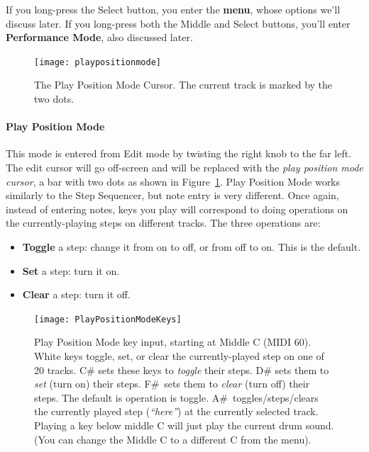 \documentclass{article}
\begin{document}
If you long-press the Select button, you enter the {\bf menu}, whose options we'll discuss later.    If you long-press both the Middle and Select buttons, you'll enter {\bf Performance Mode}, also discussed later.

\begin{figure}
\vspace{-1em}
\hspace{\fill}\texttt{[image: playpositionmode]}\hspace{\fill}
\caption{\small The Play Position Mode Cursor.  The current track is marked by the two dots.}
\vspace{-4em}
\label{playpositionmode2}
\end{figure}



\paragraph{Play Position Mode}  This mode is entered from Edit mode by twisting the right knob to the far left.  The edit cursor will go off-screen and will be replaced with the {\it play position mode cursor}, a bar with two dots as shown in Figure~\ref{playpositionmode2}.  Play Position Mode works similarly to the Step Sequencer,  but note entry is very different.   Once again, instead of entering notes, keys you play will correspond to doing operations on the currently-playing steps on different tracks. The three operations are:

\enlargethispage{1em}

\begin{itemize}
\item {\bf Toggle} a step: change it from on to off, or from off to on.  This is the default.
\item {\bf Set} a step: turn it on.
\item {\bf Clear} a step: turn it off.
\end{itemize}

\begin{figure}
\vspace{-1em}
\hspace{\fill}\texttt{[image: PlayPositionModeKeys]}
\vspace{-1em}
\caption{\small Play Position Mode key input, starting at Middle C (MIDI 60).  White keys toggle, set, or clear the currently-played step on one of 20 tracks.  C\# sets these keys to {\it toggle} their steps.  D\# sets them to {\it set} (turn on) their steps.  F\#~sets them to {\it clear} (turn off) their steps.  The default is operation is toggle.  A\#~toggles/steps/clears the currently played step ({\it ``here''}) at the currently selected track.  Playing a key below middle C will just play the current drum sound. (You can change the Middle C to a different C from the menu). }
\label{playpositionmodekeys}
\end{figure}
\end{document}
